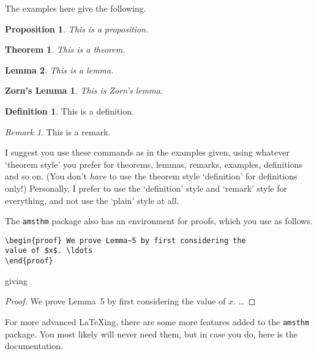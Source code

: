 \documentclass[a4paper]{article}
\newtheorem{prop}{Proposition}
\newtheorem{thm}{Theorem}[section]
\newtheorem{lem}[thm]{Lemma}
\newtheorem*{Zorn}{Zorn's Lemma}
\theoremstyle{definition}
\newtheorem{dfn}{Definition}
\theoremstyle{remark}
\newtheorem*{rmk}{Remark}
\theoremstyle{remark}
\begin{document}
The examples here give the following.

\begin{prop} This is a proposition.
\end{prop}

\begin{thm} This is a theorem.
\end{thm}

\begin{lem} This is a lemma.
\end{lem}

\begin{Zorn} This is Zorn's lemma.
\end{Zorn}

\begin{dfn} This is a definition.
\end{dfn}

\begin{rmk} This is a remark.
\end{rmk}

I suggest you use these commands as in the examples given, using whatever
`theorem style' you prefer for theorems, lemmas, remarks, examples,
definitions and so on.  (You don't \textit{have} to use the theorem 
style `definition' for definitions only!)  Personally, I prefer to use 
the `definition' style and `remark' style for everything, and not use 
the `plain' style at all.

The \texttt{amsthm} package also has an environment for proofs, 
which you use as follows.
\begin{verbatim}
\begin{proof} We prove Lemma~5 by first considering the
value of $x$. \ldots
\end{proof}
\end{verbatim}
giving
\begin{proof} We prove Lemma~5 by first considering the
value of $x$. \ldots
\end{proof}

For more advanced \LaTeX ing, there are some more features added to
the \verb|amsthm| package.  You most likely will never need them, but in 
case you do, here is the documentation.
\end{document}
